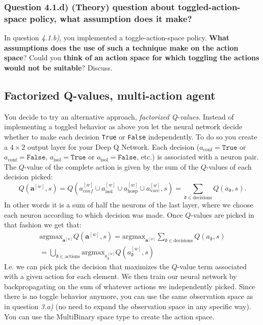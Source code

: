 \documentclass[10pt]{article}
\begin{document}
\subsubsection*{Question 4.1.d) (Theory) question about toggled-action-space policy, what assumption does it make?}

In question \textit{4.1.b)}, you implemented a toggle-action-space policy.
\textbf{What assumptions does the use of such a technique make on the action space}?
Could you \textbf{think of an action space for which toggling the actions would not be suitable}? Discuss.

\subsection{Factorized Q-values, multi-action agent}


You decide to try an alternative approach, \textit{factorized Q-values}. Instead of implementing a toggled behavior as above you let the neural network decide whether to make each decision \texttt{True} or \texttt{False} independently. To do so you create a $4\times 2$ output layer for your Deep Q Network. Each decision ($a_\text{conf} = \texttt{True}$ or $a_\text{conf} = \texttt{False}$, $a_\text{isol} = \texttt{True}$ or $a_\text{isol} = \texttt{False}$, etc.) is associated with a neuron pair. The $Q$-value of the complete action is given by the sum of the $Q$-values of each decision picked:
\begin{equation}
  Q(\mathbf{a}^{[w]}, s) = Q(  a_\textit{conf}^{[w]} \cup a_\text{isol}^{[w]} \cup a_\text{hosp}^{[w]} \cup a_\text{vacc}^{[w]} , s) = \sum_{\mathfrak{d} \in \text{decisions}} Q(a_\mathfrak{d},s).
\end{equation}
In other words it is a sum of half the neurons of the last layer, where we choose each neuron according to which decision was made. Once $Q$-values are picked in that fashion we get that:
\begin{equation}
\begin{aligned}
  \text{argmax}_{ \mathbf{a}^{[w]} }  Q(\mathbf{a}^{[w]},s) = \text{argmax}_{ \mathbf{a}^{[w]} } \sum_{\mathfrak{d} \in \text{decisions}} Q(a_\mathfrak{d},s) \\
  = \bigcup_{\mathfrak{d} \in \text{actions}}  \text{argmax}_{  a_\mathfrak{d}^{[w]} }  Q(a_\mathfrak{d}^{[w]},s)
\end{aligned}
\end{equation}
\noindent
I.e. we can pick pick the decision that maximizes the $Q$-value term associated with a given action for each element.
We then train our neural network by backpropagating on the sum of whatever actions we independently picked.
Since there is no toggle behavior anymore, you can use the same observation space as in question \textit{3.a)}
(no need to expand the observation space in any specific way).
You can use the MultiBinary space type to create the action space.\\
\end{document}
